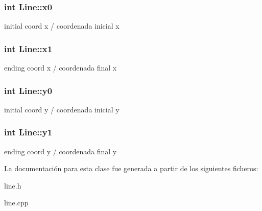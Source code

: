 \subsubsection[{x0}]{\setlength{\rightskip}{0pt plus 5cm}int Line\+::x0\hspace{0.3cm}{\ttfamily [private]}}\label{class_line_a647f6f5c0e2b197e3671f8bdb9ff64a2}
initial coord x / coordenada inicial x \hypertarget{class_line_a1c37aeef714f6c96454c2a9a2dadb69a}{}
\subsubsection[{x1}]{\setlength{\rightskip}{0pt plus 5cm}int Line\+::x1\hspace{0.3cm}{\ttfamily [private]}}\label{class_line_a1c37aeef714f6c96454c2a9a2dadb69a}
ending coord x / coordenada final x \hypertarget{class_line_a8e276229892969c7d82f56581e0c168b}{}
\subsubsection[{y0}]{\setlength{\rightskip}{0pt plus 5cm}int Line\+::y0\hspace{0.3cm}{\ttfamily [private]}}\label{class_line_a8e276229892969c7d82f56581e0c168b}
initial coord y / coordenada inicial y \hypertarget{class_line_a850c96af61bd595a68b5e867540204f1}{}
\subsubsection[{y1}]{\setlength{\rightskip}{0pt plus 5cm}int Line\+::y1\hspace{0.3cm}{\ttfamily [private]}}\label{class_line_a850c96af61bd595a68b5e867540204f1}
ending coord y / coordenada final y 

La documentación para esta clase fue generada a partir de los siguientes ficheros\+:\begin{DoxyCompactItemize}
\item 
line.\+h\item 
line.\+cpp\end{DoxyCompactItemize}
